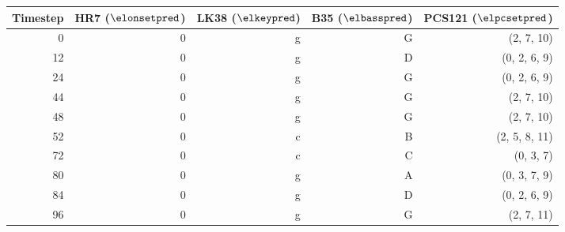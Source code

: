 \begin{tabular}{r|rrrr}
Timestep & HR7 ($\elonsetpred$) & LK38 ($\elkeypred$) & B35 ($\elbasspred$)  & PCS121 ($\elpcsetpred$)        \\ \hline
0        & 0   & g    & G    & (2, 7, 10)    \\
12       & 0   & g    & D    & (0, 2, 6, 9)  \\
24       & 0   & g    & G    & (0, 2, 6, 9)  \\
44       & 0   & g    & G    & (2, 7, 10)    \\ \hline
48       & 0   & g    & G    & (2, 7, 10)    \\
52       & 0   & c    & B    & (2, 5, 8, 11) \\
72       & 0   & c    & C    & (0, 3, 7)     \\
80       & 0   & g    & A    & (0, 3, 7, 9)  \\
84       & 0   & g    & D    & (0, 2, 6, 9)  \\
96       & 0   & g    & G    & (2, 7, 11)    \\
\end{tabular}

